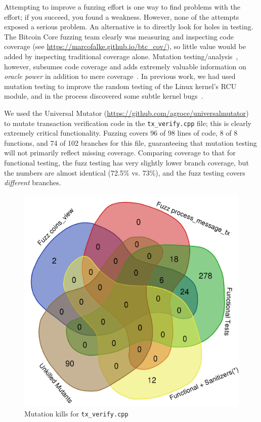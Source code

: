 \lstset{style=langstyle}

Attempting to improve a fuzzing effort is one way to find problems
with the effort; if you succeed, you found a weakness.  However, none
of the attempts exposed a serious problem.  An alternative is
to directly look for holes in testing.  The Bitcoin Core fuzzing team
clearly was measuring and inspecting code coverage (see \url{https://marcofalke.github.io/btc_cov/}), so little value
would be added by inspecting traditional coverage alone.  Mutation
testing/analysis~\cite{MutationSurvey}, however, subsumes code coverage and adds extremely
valuable information on \emph{oracle power} in addition to mere
coverage~\cite{Discontents}.    In previous work, we had
used mutation testing to improve the random testing of the Linux
kernel's RCU module, and in the process discovered some subtle kernel bugs~\cite{mutKernel,groce2018verified}.

\begin{sloppypar}
We used the Universal Mutator
\noindent(\url{https://github.com/agroce/universalmutator})~\cite{regexpMut} to
mutate transaction
verification code  in the
{\tt tx\_verify.cpp} file; this is clearly extremely critical functionality.  Fuzzing covers 96 of 98 lines of code, 8
of 8 functions, and 74 of 102 branches for this file, guaranteeing
that mutation testing will not primarily reflect missing coverage.
Comparing coverage to that for functional testing, the fuzz testing
has very slightly lower branch coverage, but the numbers are almost
identical (72.5\% vs. 73\%), and the fuzz testing covers \emph{different} branches.  
\end{sloppypar}

\begin{figure}
\vspace{2mm}
\includegraphics[width=0.6\columnwidth]{kill_pre_valgrind.png}
\caption{Mutation kills for {\tt tx\_verify.cpp}}
\label{kills}
\end{figure}


